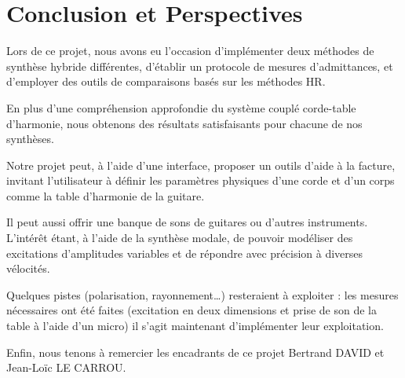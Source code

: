 \chapter*{Conclusion et Perspectives}
Lors de ce projet, nous avons eu l'occasion d'implémenter deux méthodes de synthèse hybride différentes, d'établir un protocole de mesures d'admittances, et d'employer des outils de comparaisons basés sur les méthodes HR.

En plus d'une compréhension approfondie du système couplé corde-table d'harmonie, nous obtenons des résultats satisfaisants pour chacune de nos synthèses.

Notre projet peut, à l'aide d'une interface, proposer un outils d'aide à la facture, invitant l'utilisateur à définir les paramètres physiques d'une corde et d'un corps comme la table d'harmonie de la guitare.

Il peut aussi offrir une banque de sons de guitares ou d'autres instruments. L'intérêt étant, à l'aide de la synthèse modale, de pouvoir modéliser des excitations d'amplitudes variables et de répondre avec précision à diverses vélocités.

Quelques pistes (polarisation, rayonnement\dots) resteraient à exploiter : les mesures nécessaires ont été faites (excitation en deux dimensions et prise de son de la table à l'aide d'un micro) il s'agit maintenant d'implémenter leur exploitation. 
\vspace{3mm}
\begin{center}
Enfin, nous tenons à remercier les encadrants de ce projet Bertrand DAVID et Jean-Loïc LE CARROU.
\end{center}